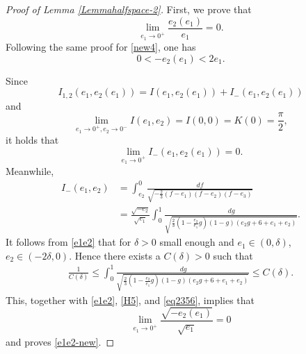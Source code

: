 \documentclass[reqno,12pt]{amsart}
\begin{document}
\begin{proof}[Proof of Lemma \ref{Lemmahalfspace-2}]
First, we prove that
    \begin{equation}\label{e1e2-new}
        \lim_{e_1\to 0^+} \frac{e_2(e_1) }{e_1} = 0. 
    \end{equation}
Following the same proof for \eqref{new4}, one has 
    \begin{equation}\label{e1e2}
        0< -e_2(e_1) < 2e_1.
    \end{equation}
    
 

Since 
\begin{equation*}
    I_{1,2}(e_1, e_2(e_1)) = I(e_1, e_2(e_1)) + I_{-}(e_1, e_2(e_1))
\end{equation*}
and 
\begin{equation*}
    \lim_{e_1\to 0^+, e_2 \to 0^-}I(e_1, e_2) = I(0, 0) = K(0)=\frac{\pi}{2}, 
\end{equation*}
it holds that
\begin{equation}\label{H5}
    \lim_{e_1 \to 0^+}I_{-}(e_1, e_2(e_1)) = 0. 
\end{equation} 
Meanwhile, 
\begin{align}  
\label{eq2356}
    I_{-}(e_1, e_2) & = \int_{e_2}^0 \frac{df}{\sqrt{-\frac23 (f-e_1)(f-e_2) (f-e_3)}} \nonumber \\
& = \frac{\sqrt{-e_2}}{\sqrt{e_1}} \int_0^1 \frac{  \, dg }{   \sqrt{\frac23 \left(1 - \frac{e_2}{e_1 } g \right) (1-g) (e_2g + 6 + e_1 +e_2)}}.
\end{align}
It follows from \eqref{e1e2} that for $\delta>0$ small enough and $e_1\in (0,\delta)$, $e_2\in(-2\delta,0)$. Hence there exists a $C(\delta)>0$ such that
\begin{align*}
 \frac{1}{C(\delta)} \leq   \int_0^1 \frac{  \, dg }{   \sqrt{\frac23 \left(1 - \frac{e_2}{e_1 } g \right) (1-g) (e_2g + 6 + e_1 +e_2)}}\leq C(\delta).
\end{align*}
This,  together with \eqref{e1e2}, \eqref{H5}, and \eqref{eq2356}, implies that 
\begin{equation*}
    \lim_{e_1 \to 0^+ } \frac{\sqrt{-e_2(e_1)}}{\sqrt{e_1}} = 0
\end{equation*}
and proves \eqref{e1e2-new}. 


\end{proof}
\end{document}
